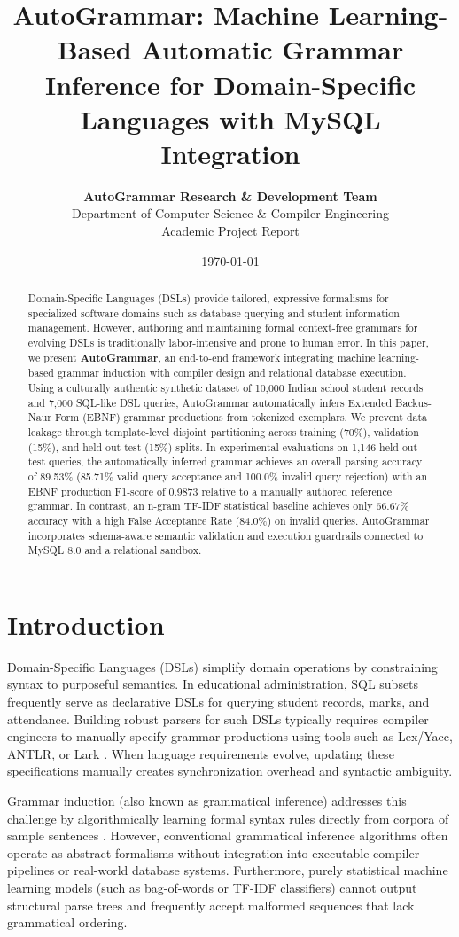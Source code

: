 \documentclass[11pt,a4paper]{article}
\title{\textbf{AutoGrammar: Machine Learning-Based Automatic Grammar Inference for Domain-Specific Languages with MySQL Integration}}
\author{
    \textbf{AutoGrammar Research \& Development Team} \\
    Department of Computer Science \& Compiler Engineering \\
    Academic Project Report
}
\date{\today}
\begin{document}
\maketitle

\begin{abstract}
Domain-Specific Languages (DSLs) provide tailored, expressive formalisms for specialized software domains such as database querying and student information management. However, authoring and maintaining formal context-free grammars for evolving DSLs is traditionally labor-intensive and prone to human error. In this paper, we present \textbf{AutoGrammar}, an end-to-end framework integrating machine learning-based grammar induction with compiler design and relational database execution. Using a culturally authentic synthetic dataset of 10,000 Indian school student records and 7,000 SQL-like DSL queries, AutoGrammar automatically infers Extended Backus-Naur Form (EBNF) grammar productions from tokenized exemplars. We prevent data leakage through template-level disjoint partitioning across training (70\%), validation (15\%), and held-out test (15\%) splits. In experimental evaluations on 1,146 held-out test queries, the automatically inferred grammar achieves an overall parsing accuracy of 89.53\% (85.71\% valid query acceptance and 100.0\% invalid query rejection) with an EBNF production F1-score of 0.9873 relative to a manually authored reference grammar. In contrast, an n-gram TF-IDF statistical baseline achieves only 66.67\% accuracy with a high False Acceptance Rate (84.0\%) on invalid queries. AutoGrammar incorporates schema-aware semantic validation and execution guardrails connected to MySQL 8.0 and a relational sandbox.
\end{abstract}

\section{Introduction}
Domain-Specific Languages (DSLs) simplify domain operations by constraining syntax to purposeful semantics. In educational administration, SQL subsets frequently serve as declarative DSLs for querying student records, marks, and attendance. Building robust parsers for such DSLs typically requires compiler engineers to manually specify grammar productions using tools such as Lex/Yacc, ANTLR, or Lark \cite{aho2006compilers}. When language requirements evolve, updating these specifications manually creates synchronization overhead and syntactic ambiguity.

Grammar induction (also known as grammatical inference) addresses this challenge by algorithmically learning formal syntax rules directly from corpora of sample sentences \cite{degroote2010grammatical}. However, conventional grammatical inference algorithms often operate as abstract formalisms without integration into executable compiler pipelines or real-world database systems. Furthermore, purely statistical machine learning models (such as bag-of-words or TF-IDF classifiers) cannot output structural parse trees and frequently accept malformed sequences that lack grammatical ordering.
\end{document}

